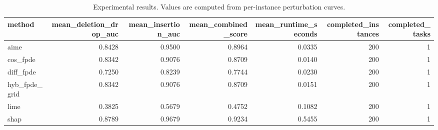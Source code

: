 \begin{table}[t]
\caption{Experimental results. Values are computed from per-instance perturbation curves.}
\label{tab:main_results_computed}
\centering
\begin{tabular}{lrrrrrr}
\toprule
method & mean\_deletion\_drop\_auc & mean\_insertion\_auc & mean\_combined\_score & mean\_runtime\_seconds & completed\_instances & completed\_tasks \\
\midrule
aime & 0.8428 & 0.9500 & 0.8964 & 0.0335 & 200 & 1 \\
cos\_fpde & 0.8342 & 0.9076 & 0.8709 & 0.0140 & 200 & 1 \\
diff\_fpde & 0.7250 & 0.8239 & 0.7744 & 0.0230 & 200 & 1 \\
hyb\_fpde\_grid & 0.8342 & 0.9076 & 0.8709 & 0.0151 & 200 & 1 \\
lime & 0.3825 & 0.5679 & 0.4752 & 0.1082 & 200 & 1 \\
shap & 0.8789 & 0.9679 & 0.9234 & 0.5455 & 200 & 1 \\
\bottomrule
\end{tabular}

\end{table}
